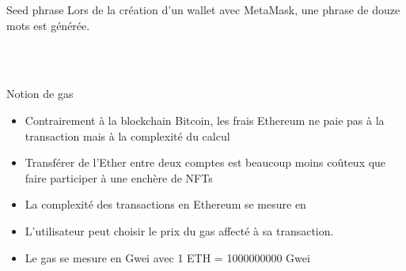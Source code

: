 \begin{frame}{Seed phrase}
  Lors de la création d'un wallet avec MetaMask, une phrase de douze mots est générée.

  \begin{center}
    \begin{tcolorbox}[arc=1ex, colback=myuniversity, colframe=myuniversity, left=3pt, right=3pt, top=3pt, bottom=2pt]
      \vspace*{1cm}
      \begin{center}
        \begin{huge}
          \textcolor{white}{
            Il faut absolument la sauvegarder en lieu sûr.\\
            Quiconque l'obtient peut accéder à tout votre wallet, vos cryptos et vos NFTs !
          }
        \end{huge}
      \end{center}
      \vspace*{1cm}
    \end{tcolorbox}
  \end{center}
\end{frame}

\begin{frame}{Notion de gas}
  \begin{itemize}
    \item Contrairement à la blockchain Bitcoin, les frais Ethereum ne paie pas à la transaction mais à la complexité du calcul
    \item Transférer de l'Ether entre deux comptes est beaucoup moins coûteux que faire participer à une enchère de NFTs
    \item La complexité des transactions en Ethereum se mesure en 
    \item L'utilisateur peut choisir le prix du gas affecté à sa transaction.
    \item Le gas se mesure en Gwei avec 1 ETH = 1000000000 Gwei
  \end{itemize}
\end{frame}